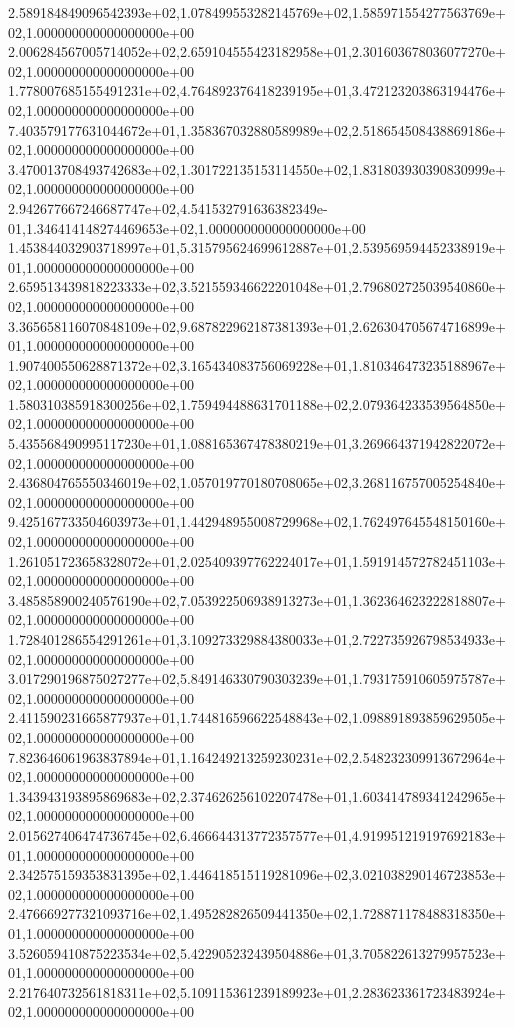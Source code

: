 2.589184849096542393e+02,1.078499553282145769e+02,1.585971554277563769e+02,1.000000000000000000e+00
2.006284567005714052e+02,2.659104555423182958e+01,2.301603678036077270e+02,1.000000000000000000e+00
1.778007685155491231e+02,4.764892376418239195e+01,3.472123203863194476e+02,1.000000000000000000e+00
7.403579177631044672e+01,1.358367032880589989e+02,2.518654508438869186e+02,1.000000000000000000e+00
3.470013708493742683e+02,1.301722135153114550e+02,1.831803930390830999e+02,1.000000000000000000e+00
2.942677667246687747e+02,4.541532791636382349e-01,1.346414148274469653e+02,1.000000000000000000e+00
1.453844032903718997e+01,5.315795624699612887e+01,2.539569594452338919e+01,1.000000000000000000e+00
2.659513439818223333e+02,3.521559346622201048e+01,2.796802725039540860e+02,1.000000000000000000e+00
3.365658116070848109e+02,9.687822962187381393e+01,2.626304705674716899e+01,1.000000000000000000e+00
1.907400550628871372e+02,3.165434083756069228e+01,1.810346473235188967e+02,1.000000000000000000e+00
1.580310385918300256e+02,1.759494488631701188e+02,2.079364233539564850e+02,1.000000000000000000e+00
5.435568490995117230e+01,1.088165367478380219e+01,3.269664371942822072e+02,1.000000000000000000e+00
2.436804765550346019e+02,1.057019770180708065e+02,3.268116757005254840e+02,1.000000000000000000e+00
9.425167733504603973e+01,1.442948955008729968e+02,1.762497645548150160e+02,1.000000000000000000e+00
1.261051723658328072e+01,2.025409397762224017e+01,1.591914572782451103e+02,1.000000000000000000e+00
3.485858900240576190e+02,7.053922506938913273e+01,1.362364623222818807e+02,1.000000000000000000e+00
1.728401286554291261e+01,3.109273329884380033e+01,2.722735926798534933e+02,1.000000000000000000e+00
3.017290196875027277e+02,5.849146330790303239e+01,1.793175910605975787e+02,1.000000000000000000e+00
2.411590231665877937e+01,1.744816596622548843e+02,1.098891893859629505e+02,1.000000000000000000e+00
7.823646061963837894e+01,1.164249213259230231e+02,2.548232309913672964e+02,1.000000000000000000e+00
1.343943193895869683e+02,2.374626256102207478e+01,1.603414789341242965e+02,1.000000000000000000e+00
2.015627406474736745e+02,6.466644313772357577e+01,4.919951219197692183e+01,1.000000000000000000e+00
2.342575159353831395e+02,1.446418515119281096e+02,3.021038290146723853e+02,1.000000000000000000e+00
2.476669277321093716e+02,1.495282826509441350e+02,1.728871178488318350e+01,1.000000000000000000e+00
3.526059410875223534e+02,5.422905232439504886e+01,3.705822613279957523e+01,1.000000000000000000e+00
2.217640732561818311e+02,5.109115361239189923e+01,2.283623361723483924e+02,1.000000000000000000e+00
